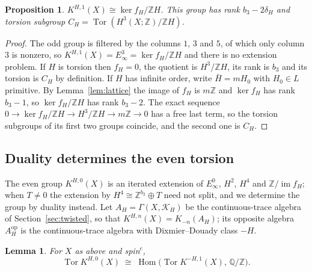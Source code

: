 \documentclass[reqno,11pt]{amsart}
\newtheorem{proposition}[theorem]{Proposition}
\newtheorem{lemma}[theorem]{Lemma}
\theoremstyle{definition}
\newcommand{\ZZ}{\mathbb{Z}}
\newcommand{\QQ}{\mathbb{Q}}
\DeclareMathOperator{\im}{im}
\DeclareMathOperator{\Tor}{Tor}
\DeclareMathOperator{\Hom}{Hom}
\begin{document}
\begin{proposition}\label{prop:odd}
$K^{H,1}(X)\cong\ker f_H/\ZZ H$. This group has rank $b_3-2\delta_H$ and torsion subgroup $C_H=\Tor(H^3(X;\ZZ)/\ZZ H)$.
\end{proposition}

\begin{proof}
The odd group is filtered by the columns $1$, $3$ and $5$, of which only column $3$ is nonzero, so $K^{H,1}(X)=E_\infty^3=\ker f_H/\ZZ H$ and there is no extension problem. If $H$ is torsion then $f_H=0$, the quotient is $H^3/\ZZ H$, its rank is $b_3$ and its torsion is $C_H$ by definition. If $H$ has infinite order, write $\bar H=mH_0$ with $H_0\in L$ primitive. By Lemma~\ref{lem:lattice} the image of $f_H$ is $m\ZZ$ and $\ker f_H$ has rank $b_3-1$, so $\ker f_H/\ZZ H$ has rank $b_3-2$. The exact sequence $0\to\ker f_H/\ZZ H\to H^3/\ZZ H\to m\ZZ\to0$ has a free last term, so the torsion subgroups of its first two groups coincide, and the second one is $C_H$.
\end{proof}

\subsection{Duality determines the even torsion}
The even group $K^{H,0}(X)$ is an iterated extension of $E_\infty^{0}$, $H^2$, $H^4$ and $\ZZ/\im f_H$; when $T\ne0$ the extension by $H^4\cong\ZZ^{b_2}\oplus T$ need not split, and we determine the group by duality instead. Let $A_H=\Gamma(X,\mathcal K_H)$ be the continuous-trace algebra of Section~\ref{sec:twisted}, so that $K^{H,n}(X)=K_{-n}(A_H)$; its opposite algebra $A_H^{\mathrm{op}}$ is the continuous-trace algebra with Dixmier--Douady class $-H$.

\begin{lemma}\label{lem:duality}
For $X$ as above and spin$^c$,
\[
\Tor K^{H,0}(X)\;\cong\;\Hom\bigl(\Tor K^{-H,1}(X),\,\QQ/\ZZ\bigr).
\]
\end{lemma}
\end{document}
